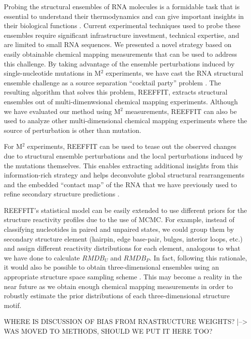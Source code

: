 \documentclass[12pt]{article}
\begin{document}
Probing the structural ensembles of RNA molecules is a formidable task that is essential to understand their thermodynamics and can give important insights in their biological functions \cite{Bothe2011}. 
Current experimental techniques used to probe these ensembles require significant infrastructure investment, technical expertise, and are limited to small RNA sequences. 
We presented a novel strategy based on easily obtainable chemical mapping measurements that can be used to address this challenge. 
By taking advantage of the ensemble perturbations induced by single-nucleotide mutations in M$^2$ experiments, we have cast the RNA structural ensemble challenge as a source separation ``cocktail party'' problem \cite{Cardoso1998}. 
The resulting algorithm that solves this problem, REEFFIT, extracts structural ensembles out of multi-dimenwsional chemical mapping experiments. 
Although we have evaluated our method using M$^2$ measurements, REEFFIT can also be used to analyze other multi-dimensional chemical mapping experiments where the source of perturbation is other than mutation. 

For M$^2$ experiments, REEFFIT can be used to tease out the observed changes due to structural ensemble perturbations and the local perturbations induced by the mutations themselves. 
This enables extracting additional insights from this information-rich strategy and helps deconvolute global structural rearrangements and the embedded “contact map” of the RNA that we have previously used to refine secondary structure predictions \cite{Kladwang2011f}.

REEFFIT's statistical model can be easily extended to use different priors for the structure reactivity profiles due to the use of MCMC. 
For example, instead of classifying nucleotides in paired and unpaired states, we could group them by secondary structure element (hairpin, edge base-pair, bulges, interior loops, etc.) and assign different reactivity distributions for each element, analogous to what we have done to calculate $RMDB_U$ and $RMDB_P$. 
In fact, following this rationale, it would also be possible to obtain three-dimensional ensembles using an appropriate structure space sampling scheme \cite{Frellsen2009,Das2007,Das2010,Jonikas2009}. 
This may become a reality in the near future as we obtain enough chemical mapping measurements in order to robustly estimate the prior distributions of each three-dimensional structure motif.

WHERE IS DISCUSSION OF BIAS FROM RNASTRUCTURE WEIGHTS? |--> WAS MOVED TO METHODS, SHOULD WE PUT IT HERE TOO?
\end{document}
